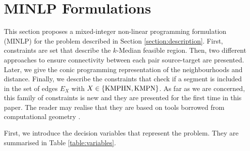 \documentclass[a4paper,  review, authoryear, 1p.]{elsarticle}
\newcommand{\JP}[1]{{\color{blue}#1}}
\begin{document}
	\section{MINLP Formulations}\label{section:formulations}
	
	This section proposes a mixed-integer non-linear programming formulation (MINLP) for the problem described in Section \ref{section:description}. First, constraints are set that describe the $k$-Median feasible region. Then, two different approaches to ensure connectivity between each pair source-target are presented. Later, we give the conic programming representation of the neighbourhoods and distance. Finally, we describe the constraints that check if a segment is included in the set of edges $E_X$ with $X\in \{\rm KMPHN, \rm KMPN\}$. \JP{As far as we are concerned, this family of constraints is new and they are presented for the first time in this paper. The reader may realise that they are based on tools borrowed from computational geometry \citep{deberg1990,daescu2008}. }
		
		
	First, we introduce the decision variables that represent the problem. They are summarised in Table \ref{table:variables}.

	 
\end{document}

